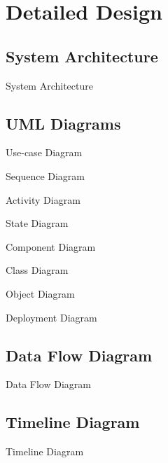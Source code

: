 \section{Detailed Design}

\subsection{System Architecture}
\begin{frame}{System Architecture}

\end{frame}

\subsection{UML Diagrams}
\begin{frame}{Use-case Diagram}

\end{frame}

\begin{frame}{Sequence Diagram}

\end{frame}

\begin{frame}{Activity Diagram}

\end{frame}

\begin{frame}{State Diagram}

\end{frame}

\begin{frame}{Component Diagram}

\end{frame}

\begin{frame}{Class Diagram}

\end{frame}

\begin{frame}{Object Diagram}

\end{frame}

\begin{frame}{Deployment Diagram}

\end{frame}

\subsection{Data Flow Diagram}
\begin{frame}{Data Flow Diagram}
	
\end{frame}

\subsection{Timeline Diagram}
\begin{frame}{Timeline Diagram}
	
\end{frame}